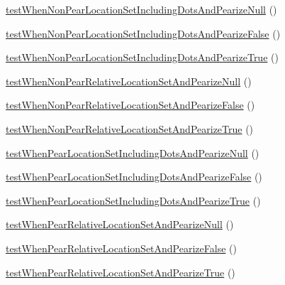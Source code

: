 \begin{DoxyCompactItemize}
\hyperlink{classtests___parser_page_get_source_location_tests_adc45c247191b61e54ae0c3130282eca2}{test\-When\-Non\-Pear\-Location\-Set\-Including\-Dots\-And\-Pearize\-Null} ()
\item 
\hyperlink{classtests___parser_page_get_source_location_tests_aa7f2e194ac6c3a48d4e3b99b9b22233f}{test\-When\-Non\-Pear\-Location\-Set\-Including\-Dots\-And\-Pearize\-False} ()
\item 
\hyperlink{classtests___parser_page_get_source_location_tests_a847f160fa013c177f1526beb60cf4f79}{test\-When\-Non\-Pear\-Location\-Set\-Including\-Dots\-And\-Pearize\-True} ()
\item 
\hyperlink{classtests___parser_page_get_source_location_tests_a0fd688d2f78f2e4f1e6713f9c273d846}{test\-When\-Non\-Pear\-Relative\-Location\-Set\-And\-Pearize\-Null} ()
\item 
\hyperlink{classtests___parser_page_get_source_location_tests_a062f7d0a5c7f617dc7a333feb9ebc583}{test\-When\-Non\-Pear\-Relative\-Location\-Set\-And\-Pearize\-False} ()
\item 
\hyperlink{classtests___parser_page_get_source_location_tests_a50ce479875ea0be03800dc0b6728ceb6}{test\-When\-Non\-Pear\-Relative\-Location\-Set\-And\-Pearize\-True} ()
\item 
\hyperlink{classtests___parser_page_get_source_location_tests_a97a31244f5f7d7e68028622f2b1f7e4f}{test\-When\-Pear\-Location\-Set\-Including\-Dots\-And\-Pearize\-Null} ()
\item 
\hyperlink{classtests___parser_page_get_source_location_tests_aa53958cf3d5fd242912b163f90953f6e}{test\-When\-Pear\-Location\-Set\-Including\-Dots\-And\-Pearize\-False} ()
\item 
\hyperlink{classtests___parser_page_get_source_location_tests_a98086ae5b2259b9d23ba9556b89123ad}{test\-When\-Pear\-Location\-Set\-Including\-Dots\-And\-Pearize\-True} ()
\item 
\hyperlink{classtests___parser_page_get_source_location_tests_abc271ab5c1f27e126ad4ee1facf43fc3}{test\-When\-Pear\-Relative\-Location\-Set\-And\-Pearize\-Null} ()
\item 
\hyperlink{classtests___parser_page_get_source_location_tests_affe812f239b0f76667c67d332a7b8a8a}{test\-When\-Pear\-Relative\-Location\-Set\-And\-Pearize\-False} ()
\item 
\hyperlink{classtests___parser_page_get_source_location_tests_a28d55f311e7315fe226c224f295b93ba}{test\-When\-Pear\-Relative\-Location\-Set\-And\-Pearize\-True} ()
\end{DoxyCompactItemize}
